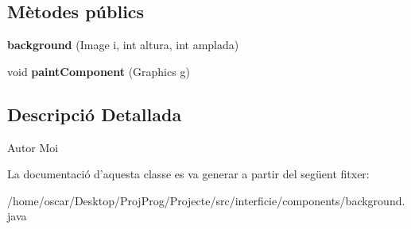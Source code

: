 \subsection*{Mètodes públics}
\begin{DoxyCompactItemize}
\item 
\hypertarget{classinterficie_1_1components_1_1background_ade3951f31e1978fb7356e6da7b58370a}{{\bfseries background} (Image i, int altura, int amplada)}\label{classinterficie_1_1components_1_1background_ade3951f31e1978fb7356e6da7b58370a}

\item 
\hypertarget{classinterficie_1_1components_1_1background_a608c6de732e03af5e288245600e1b5ed}{void {\bfseries paint\+Component} (Graphics g)}\label{classinterficie_1_1components_1_1background_a608c6de732e03af5e288245600e1b5ed}

\end{DoxyCompactItemize}


\subsection{Descripció Detallada}
\begin{DoxyAuthor}{Autor}
Moi 
\end{DoxyAuthor}


La documentació d'aquesta classe es va generar a partir del següent fitxer\+:\begin{DoxyCompactItemize}
\item 
/home/oscar/\+Desktop/\+Proj\+Prog/\+Projecte/src/interficie/components/background.\+java\end{DoxyCompactItemize}
